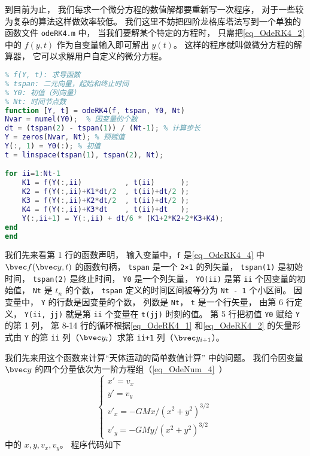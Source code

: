 到目前为止， 我们每求一个微分方程的数值解都要重新写一次程序， 对于一些较为复杂的算法这样做效率较低。 我们这里不妨把四阶龙格库塔法写到一个单独的函数文件 \verb|odeRK4.m| 中， 当我们要解某个特定的方程时， 只需把\autoref{eq_OdeRK4_2} 中的 $f(y, t)$ 作为自变量输入即可解出 $y(t)$。 这样的程序就叫做微分方程的解算器， 它可以求解用户自定义的微分方程。

\begin{lstlisting}[language=matlab, caption=odeRK4.m]
% 四阶龙格库塔定步长节微分方程
% f(Y, t): 求导函数
% tspan: 二元向量，起始和终止时间
% Y0: 初值（列向量）
% Nt: 时间节点数
function [Y, t] = odeRK4(f, tspan, Y0, Nt)
Nvar = numel(Y0);  % 因变量的个数
dt = (tspan(2) - tspan(1)) / (Nt-1); % 计算步长
Y = zeros(Nvar, Nt); % 预赋值
Y(:, 1) = Y0(:); % 初值
t = linspace(tspan(1), tspan(2), Nt);

for ii=1:Nt-1
    K1 = f(Y(:,ii)          , t(ii)      );
    K2 = f(Y(:,ii)+K1*dt/2  , t(ii)+dt/2 );
    K3 = f(Y(:,ii)+K2*dt/2  , t(ii)+dt/2 );
    K4 = f(Y(:,ii)+K3*dt    , t(ii)+dt   );
    Y(:,ii+1) = Y(:,ii) + dt/6 * (K1+2*K2+2*K3+K4);
end
end
\end{lstlisting}

我们先来看第 1 行的函数声明， 输入变量中，\verb|f| 是\autoref{eq_OdeRK4_4} 中 $\bvec f(\bvec y, t)$ 的函数句柄， \verb|tspan| 是一个 \verb|2×1| 的列矢量， \verb|tspan(1)| 是初始时间， \verb|tspan(2)| 是终止时间， \verb|Y0| 是一个列矢量， \verb|Y0(ii)| 是第 \verb|ii| 个因变量的初始值， \verb|Nt| 是 $t_n$ 的个数， \verb|tspan| 定义的时间区间被等分为 \verb|Nt - 1| 个小区间。 因变量中， \verb|Y| 的行数是因变量的个数， 列数是 \verb|Nt|， \verb|t| 是一个行矢量， 由第 6 行定义， \verb|Y(ii, jj)| 就是第 \verb|ii| 个变量在 \verb|t(jj)| 时刻的值。 第 5 行把初值 \verb|Y0| 赋给 \verb|Y| 的第 1 列， 第 8-14 行的循环根据\autoref{eq_OdeRK4_1} 和\autoref{eq_OdeRK4_2} 的矢量形式由 \verb|Y| 的第 \verb|ii| 列（$\bvec y_i$）求第 \verb|ii+1| 列（$\bvec y_{i+1}$）。

我们先来用这个函数来计算“天体运动的简单数值计算” 中的问题。 我们令因变量 $\bvec y$ 的四个分量依次为一阶方程组（\autoref{eq_OdeNum_4}~）
\begin{equation}\label{eq_OdeRK4_5}
\begin{cases}
x' = v_x\\
y' = v_y\\
v'_x = -GMx/(x^2 + y^2)^{3/2}\\
v'_y = -GMy/(x^2 + y^2)^{3/2}
\end{cases}~
\end{equation}
中的 $x, y, v_x, v_y$。 程序代码如下

